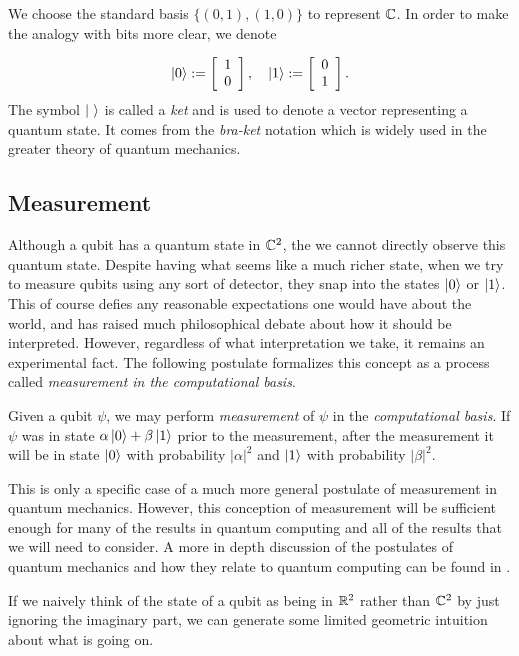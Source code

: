     We choose the standard basis $\{(0,1), (1,0)\}$ to represent $\mathbb{C}$. In order to make the analogy with bits more 
    clear, we denote            
    
    \[
            \ket{0} := \left[\begin{array}{r}1\\0\end{array}\right], \quad
            \ket{1} := \left[\begin{array}{r}0\\1\end{array}\right].
         \]
         The symbol $\ket{\ }$ is called a \emph{ket} and is used to denote a vector representing a quantum state.  
         It comes from the \emph{bra-ket} notation which is widely used in the greater theory of quantum mechanics.
        
        
         \subsection{Measurement} 
         
         Although a qubit has a quantum state in $\mathbb{C}^2$, the we cannot directly observe this quantum state. Despite 
         having what seems like a much richer state, when we try to measure qubits using any sort of detector, they 
         snap into the states $\ket{0}$ or $\ket{1}$. This of course defies any reasonable expectations one would 
         have about the world, and has raised much philosophical debate about how it should be interpreted. 
         However, regardless of what interpretation we take, it remains an experimental fact. The following 
         postulate formalizes this concept as a process called \emph{measurement in the computational basis}.

         \begin{postulate}
             Given a qubit $\psi$, we may perform \emph{measurement} of $\psi$ in the \emph{computational basis}. 
             If $\psi$ was in state $\alpha \ket{0} + \beta \ket{1}$ prior to the measurement, after the 
             measurement it will be in state $\ket{0}$ with probability $|\alpha|^2$ and $ \ket{1}$ with 
             probability $|\beta|^2.$
     \end{postulate}

        This is only a specific case of a much more general postulate of measurement in quantum mechanics. However, 
        this conception of measurement will be sufficient enough for many of the results in quantum computing and 
        all of the results that we will need to consider. A more in depth discussion of the postulates of quantum 
        mechanics and how they relate to quantum computing can be found in \cite{Nielsen&Chuang}.
        
        If we naively think of the state of a qubit as being in $\mathbb{R}^2$ rather than $\mathbb{C}^2$ by just ignoring the 
        imaginary part, we can generate some limited geometric intuition about what is going on.


